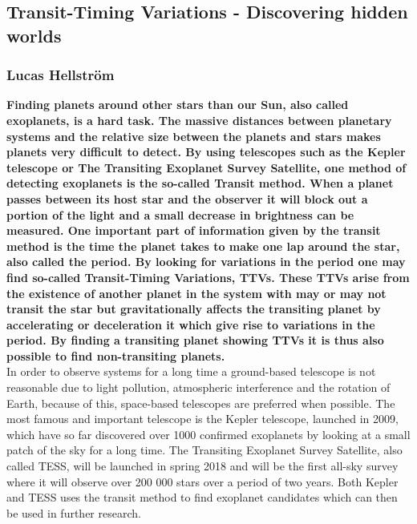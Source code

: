 \documentclass[titlepage]{article}
\begin{document}
	\begin{center}
	\section*{Transit-Timing Variations - Discovering hidden worlds}
	\subsubsection*{Lucas Hellström}
	\end{center}
	\textbf{Finding planets around other stars than our Sun, also called exoplanets, is a hard task. The massive distances between planetary systems and the relative size between the planets and stars makes planets very difficult to detect. By using telescopes such as the Kepler telescope or The Transiting Exoplanet Survey Satellite, one method of detecting exoplanets is the so-called Transit method. When a planet passes between its host star and the observer it will block out a portion of the light and a small decrease in brightness can be measured. One important part of information given by the transit method is the time the planet takes to make one lap around the star, also called the period. By looking for variations in the period one may find so-called Transit-Timing Variations, TTVs. These TTVs arise from the existence of another planet in the system with may or may not transit the star but gravitationally affects the transiting planet by accelerating or deceleration it which give rise to variations in the period. By finding a transiting planet showing TTVs it is thus also possible to find non-transiting planets.}\\
	
	\vspace{0.5cm}\noindent In order to observe systems for a long time a ground-based telescope is not reasonable due to light pollution, atmospheric interference and the rotation of Earth, because of this, space-based telescopes are preferred when possible. The most famous and important telescope is the Kepler telescope, launched in 2009, which have so far discovered over 1000 confirmed exoplanets  by looking at a small patch of the sky for a long time. The Transiting Exoplanet Survey Satellite, also called TESS, will be launched in spring 2018 and will be the first all-sky survey where it will observe over 200 000 stars over a period of two years. Both Kepler and TESS uses the transit method to find exoplanet candidates which can then be used in further research.  	
	
\end{document}
